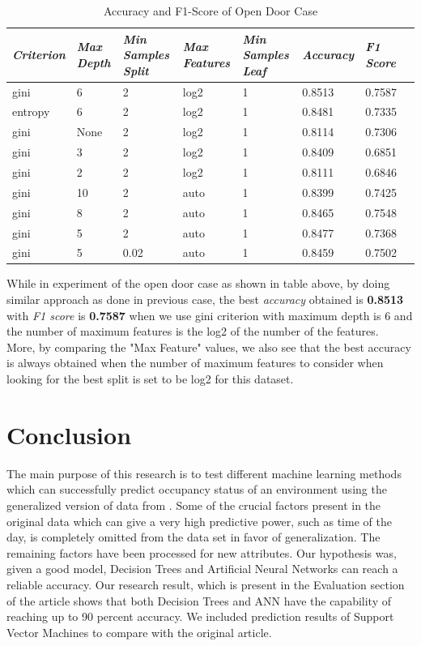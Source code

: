 \documentclass[conference]{IEEEtran}
\begin{document}
\begin{table}[H]
	\centering
	\caption{Accuracy and F1-Score of Open Door Case}
	\label{AllArches7}
	\begin{tabular}{|p{1cm}|p{0.7cm}|p{0.7cm}|p{0.7cm}|p{1cm}|p{1cm}|p{1cm}|p{1cm}|}
	    \hline
		\textit{Criterion} 
		& \textit{Max Depth}
		& \textit{Min Samples Split}
		& \textit{Max Features}
		& \textit{Min Samples Leaf}
		& \textit{Accuracy}
		& \textit{F1 Score}\\ \hline
		gini & 6 & 2 & log2 & 1 & \cellcolor{green!25}0.8513 & \cellcolor{green!25}0.7587\\ \hline
		entropy & 6 & 2 & log2 & 1 & 0.8481 & 0.7335\\ \hline
		gini & None & 2 & log2 & 1 & 0.8114 & 0.7306\\ \hline
		gini & 3 & 2 & log2 & 1 & 0.8409 & 0.6851\\ \hline
		gini & 2 & 2 & log2 & 1 & 0.8111 & 0.6846\\ \hline
		gini & 10 & 2 & auto & 1 & 0.8399 & 0.7425\\ \hline
		gini & 8 & 2 & auto & 1 & 0.8465 & 0.7548\\ \hline
		gini & 5 & 2 & auto & 1 & 0.8477 & 0.7368\\ \hline
		gini & 5 & 0.02 & auto & 1 & 0.8459 & 0.7502\\ \hline
	\end{tabular}
\end{table}

While in experiment of the open door case as shown in table above, by doing similar approach as done in previous case, the best \textit{accuracy} obtained is \textbf{0.8513} with \textit{F1 score} is \textbf{0.7587} when we use gini criterion with maximum depth is 6 and the number of maximum features is the log2 of the number of the features.\\

More, by comparing the "Max Feature" values, we also see that the best accuracy is always obtained when the number of maximum features to consider when looking for the best split is set to be log2 for this dataset. \\

\section{Conclusion}
The main purpose of this research is to test different
machine learning methods which can successfully predict
occupancy status of an environment using the generalized
version of data from \cite{Candanedo}. Some of the crucial factors
present in the original data which can give a very high
predictive power, such as time of the day, is completely
omitted from the data set in favor of generalization. The
remaining factors have been processed for new attributes.
Our hypothesis was, given a good model, Decision Trees and Artificial
Neural Networks can reach a reliable accuracy. Our research result, which is present
in the Evaluation section of the article shows that both Decision Trees and ANN have the capability of reaching up to 90
percent accuracy. We included prediction results of
Support Vector Machines to compare with the original article.\\
\end{document}

